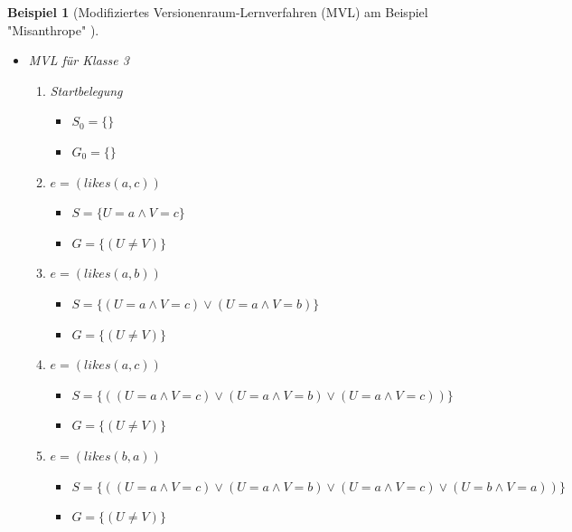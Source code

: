 \documentclass[a4paper, 11pt]{book}
\newtheorem{Bsp}{Beispiel}[section]
\begin{document}
\begin{Bsp}[Modifiziertes Versionenraum-Lernverfahren (MVL) am Beispiel "{}Misanthrope"{} ]
\begin{itemize}
\begin{enumerate}
		\item $ e = (likes(c,b)) $
		\begin{itemize}
			\item $ S = \{U = c \land V = b\}$ 
			\item $ G = \{(U \neq V)\} $
		\end{itemize}
		\item $ e = (likes(b,c)) $
		\begin{itemize}
			\item \item $ S = \{(U = c \land V = b) \lor (U = b \land V = c)\}$ 
			\item $ G = \{(U \neq V)\} $
		\end{itemize}
		\end{enumerate}
	\item MVL für Klasse 3
	\begin{enumerate}
		\item Startbelegung
		\begin{itemize}
			\item $ S_0 = \{\}$ 
			\item $ G_0 = \{\} $
		\end{itemize}
		\item $ e = (likes(a,c)) $
		\begin{itemize}
			\item $ S = \{U = a \land V = c\}$ 
			\item $ G = \{(U \neq V)\} $
		\end{itemize}
		\item $ e = (likes(a,b)) $
		\begin{itemize}
			\item $ S = \{(U = a \land V = c) \lor (U = a \land V = b)\}$ 
			\item $ G = \{(U \neq V)\} $
		\end{itemize}
		\item $ e = (likes(a,c)) $
		\begin{itemize}
			\item $ S = \{((U = a \land V = c) \lor (U = a \land V = b) \lor (U = a \land V = c))\}$ 
			\item $ G = \{(U \neq V)\} $
		\end{itemize}	
		\item $ e = (likes(b,a)) $
		\begin{itemize}
			\item $ S = \{((U = a \land V = c) \lor (U = a \land V = b) \lor (U = a \land V = c) \lor (U = b \land V = a))\}$ 
			\item $ G = \{(U \neq V)\} $

\end{itemize}
\end{enumerate}
\end{itemize}
\end{Bsp}
\end{document}
